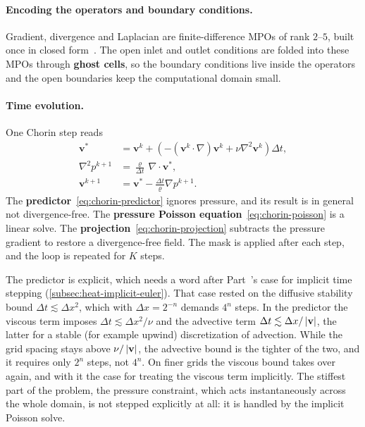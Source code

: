 \paragraph{Encoding the operators and boundary conditions.}
Gradient, divergence and Laplacian are finite-difference MPOs of rank $2$--$5$,
built once in closed form~\cite{Kazeev2012}. The open inlet and outlet
conditions are folded into these MPOs through \textbf{ghost cells}, so the
boundary conditions live inside the operators and the open boundaries keep the
computational domain small.

\paragraph{Time evolution.}
One Chorin step reads
\begin{align}
  \mathbf{v}^{*} &= \mathbf{v}^{k}
    + \left(-(\mathbf{v}^{k}\cdot\nabla)\mathbf{v}^{k}
    + \nu\nabla^2\mathbf{v}^{k}\right)\Delta t,
    \label{eq:chorin-predictor}\\
  \nabla^2 p^{k+1} &= \frac{\varrho}{\Delta t}\,
    \nabla\cdot\mathbf{v}^{*},
    \label{eq:chorin-poisson}\\
  \mathbf{v}^{k+1} &= \mathbf{v}^{*}
    - \frac{\Delta t}{\varrho}\nabla p^{k+1}.
    \label{eq:chorin-projection}
\end{align}
The \textbf{predictor}~\eqref{eq:chorin-predictor} ignores pressure, and its
result is in general not divergence-free. The \textbf{pressure
Poisson equation}~\eqref{eq:chorin-poisson} is a linear solve. The
\textbf{projection}~\eqref{eq:chorin-projection} subtracts the pressure gradient
to restore a divergence-free field. The mask is applied after each step,
and the loop is repeated for $K$ steps.

The predictor is explicit, which needs a word after Part~'s case for
implicit time stepping (\cref{subsec:heat-implicit-euler}). That case rested on
the diffusive stability bound $\Delta t \lesssim \Delta x^2$, which with
$\Delta x = 2^{-n}$ demands $4^n$ steps. In the predictor the viscous term
imposes $\Delta t \lesssim \Delta x^2/\nu$ and the advective term
$\Delta t \lesssim \Delta x/\left|\mathbf{v}\right|$, the latter for a stable (for
example upwind) discretization of advection. While the grid spacing stays above
$\nu/\left|\mathbf{v}\right|$, the advective bound is the tighter of the two, and it
requires only $2^n$ steps, not $4^n$. On finer grids the viscous bound takes
over again, and with it the case for treating the viscous term implicitly. The stiffest part of the
problem, the pressure constraint, which acts instantaneously across the whole
domain, is not stepped explicitly at all: it is handled by the implicit Poisson
solve.

